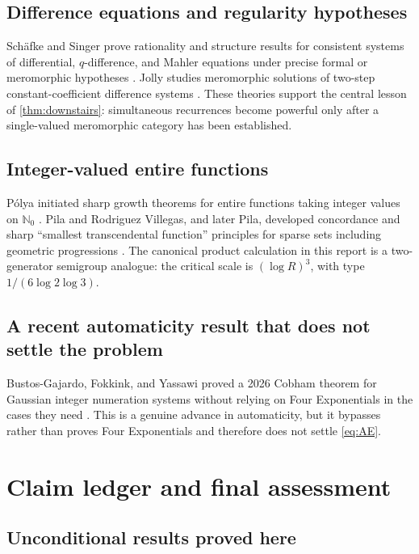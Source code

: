 \documentclass[11pt,oneside]{article}
\theoremstyle{definition}
\theoremstyle{remark}
\newcommand{\Nzero}{\mathbb N_0}
\begin{document}
\subsection{Difference equations and regularity hypotheses}

Sch\"afke and Singer prove rationality and structure results for consistent systems of differential, \(q\)-difference, and Mahler equations under precise formal or meromorphic hypotheses \cite{SchaefkeSinger2019,SchaefkeSingerMahler2017}.  Jolly studies meromorphic solutions of two-step constant-coefficient difference systems \cite{Jolly2002}.  These theories support the central lesson of \cref{thm:downstairs}: simultaneous recurrences become powerful only after a single-valued meromorphic category has been established.

\subsection{Integer-valued entire functions}

P\'olya initiated sharp growth theorems for entire functions taking integer values on \(\Nzero\) \cite{Polya1915}.  Pila and Rodriguez Villegas, and later Pila, developed concordance and sharp ``smallest transcendental function'' principles for sparse sets including geometric progressions \cite{PilaRodriguez1999,Pila2003}.  The canonical product calculation in this report is a two-generator semigroup analogue: the critical scale is
\((\log R)^3\), with type \(1/(6\log2\log3)\).

\subsection{A recent automaticity result that does not settle the problem}

Bustos-Gajardo, Fokkink, and Yassawi proved a 2026 Cobham theorem for Gaussian integer numeration systems without relying on Four Exponentials in the cases they need \cite{BustosFokkinkYassawi2026}.  This is a genuine advance in automaticity, but it bypasses rather than proves Four Exponentials and therefore does not settle \eqref{eq:AE}.

\section{Claim ledger and final assessment}

\subsection{Unconditional results proved here}
\end{document}
